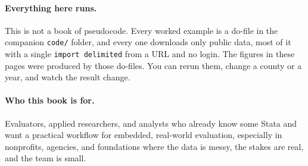 \documentclass[
    a4paper,
    fontsize=10pt,
    twoside=true,
    numbers=noenddot,
]{kaobook}
\begin{document}
\paragraph{Everything here runs.} This is not a book of pseudocode. Every worked example is a do-file in the companion \texttt{code/} folder, and every one downloads only public data, most of it with a single \texttt{import delimited} from a URL and no login. The figures in these pages were produced by those do-files. You can rerun them, change a county or a year, and watch the result change.

\paragraph{Who this book is for.} Evaluators, applied researchers, and analysts who already know some Stata and want a practical workflow for embedded, real-world evaluation, especially in nonprofits, agencies, and foundations where the data is messy, the stakes are real, and the team is small.
\end{document}
